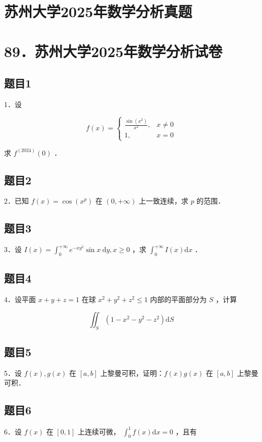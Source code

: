 \documentclass{article}
\begin{document}
\section*{苏州大学2025年数学分析真题}
\section*{89．苏州大学2025年数学分析试卷}

\subsection{题目1}
1．设

\[
f(x)= \begin{cases}\frac{\sin \left(x^{2}\right)}{x^{2}}, & x \neq 0 \\ 1, & x=0\end{cases}
\]

求 \(f^{(2024)}(0)\) ．

\subsection{题目2}
2．已知 \(f(x)=\cos \left(x^{p}\right)\) 在 \((0,+\infty)\) 上一致连续，求 \(p\) 的范围．

\subsection{题目3}
3．设 \(I(x)=\int_{0}^{+\infty} e^{-x y^{2}} \sin x \mathrm{~d} y, x \geq 0\) ，求 \(\int_{0}^{+\infty} I(x) \mathrm{d} x\) ．

\subsection{题目4}
4．设平面 \(x+y+z=1\) 在球 \(x^{2}+y^{2}+z^{2} \leq 1\) 内部的平面部分为 \(S\) ，计算

\[
\iint_{S}\left(1-x^{2}-y^{2}-z^{2}\right) \mathrm{d} S
\]

\subsection{题目5}
5．设 \(f(x), g(x)\) 在 \([a, b]\) 上黎曼可积，证明：\(f(x) g(x)\) 在 \([a, b]\) 上黎曼可积．

\subsection{题目6}
6．设 \(f(x)\) 在 \([0,1]\) 上连续可微， \(\int_{0}^{1} f(x) \mathrm{d} x=0\) ，且有
\end{document}
